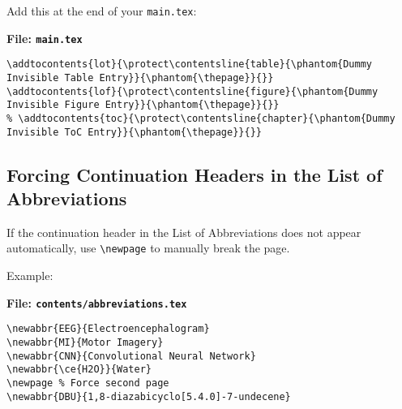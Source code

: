 \documentclass{VISTEC}
\begin{document}
\begin{subparagraph}
Add this at the end of your \texttt{main.tex}:
\end{subparagraph}

\noindent\textbf{File: \texttt{main.tex}}\vspace{-1.5em}
\begin{verbatim}
\addtocontents{lot}{\protect\contentsline{table}{\phantom{Dummy Invisible Table Entry}}{\phantom{\thepage}}{}}
\addtocontents{lof}{\protect\contentsline{figure}{\phantom{Dummy Invisible Figure Entry}}{\phantom{\thepage}}{}}
% \addtocontents{toc}{\protect\contentsline{chapter}{\phantom{Dummy Invisible ToC Entry}}{\phantom{\thepage}}{}}
\end{verbatim}

\subsection{Forcing Continuation Headers in the List of Abbreviations}

\begin{subparagraph}
If the continuation header in the List of Abbreviations does not appear automatically, use \verb|\newpage| to manually break the page.
\end{subparagraph}

\begin{subparagraph}
Example:
\end{subparagraph}

\noindent\textbf{File: \texttt{contents/abbreviations.tex}}\vspace{-1.5em}
\begin{verbatim}
\newabbr{EEG}{Electroencephalogram}
\newabbr{MI}{Motor Imagery}
\newabbr{CNN}{Convolutional Neural Network}
\newabbr{\ce{H2O}}{Water}
\newpage % Force second page
\newabbr{DBU}{1,8-diazabicyclo[5.4.0]-7-undecene}
\end{verbatim}
\end{document}
